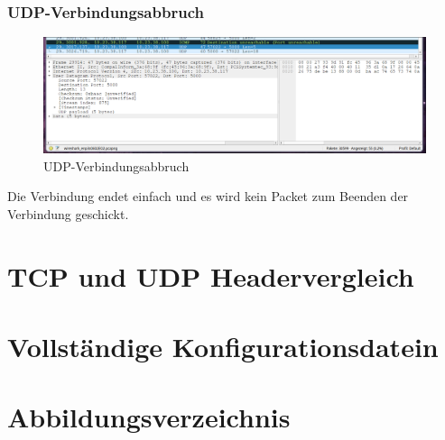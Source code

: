 \documentclass[a4paper]{article}
\begin{document}
\subsubsection{UDP-Verbindungsabbruch}
\begin{figure}[h]
	\includegraphics[scale=0.3]{images/udpverbindungsaufbau.png}
	\caption{UDP-Verbindungsabbruch}
\end{figure}
Die Verbindung endet einfach und es wird kein Packet zum Beenden der Verbindung geschickt.
\section{TCP und UDP Headervergleich}

\newpage

\section{Vollständige Konfigurationsdatein}

\newpage

\section{Abbildungsverzeichnis}

\listoffigures
\end{document}
